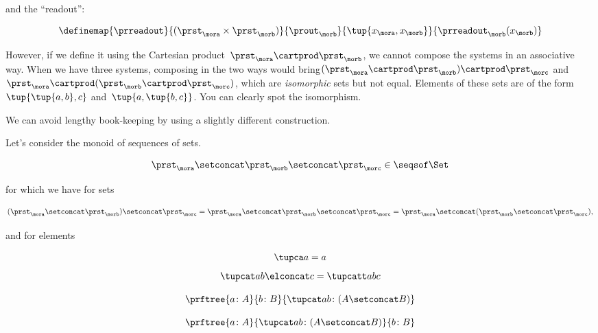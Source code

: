 and the ``readout'':

\begin{equation}
  \definemap{
    \prreadout
    }{
      (\prst_{\mora} \times \prst_{\morb}) 
    }{
      \prout_{\morb}
    }{
      \tup{x_{\mora}, x_{\morb}}
    }{
      \prreadout_{\morb}(x_{\morb})
    }
\end{equation}

However, if we define it using the Cartesian product~$\prst_{\mora} \cartprod \prst_{\morb}$, we cannot compose the systems in an associative way.
When we have three systems, composing in the two ways would bring$(\prst_{\mora} \cartprod \prst_{\morb}) \cartprod \prst_{\morc}$ and~$\prst_{\mora} \cartprod (\prst_{\morb} \cartprod \prst_{\morc})$, which are \emph{isomorphic} sets but not equal.
Elements of these sets are of the form~$\tup{\tup{a,b},c}$ and~$\tup{a, \tup{b,c}}$. You can clearly spot the isomorphism.

We can avoid lengthy book-keeping by using a slightly different construction. 

Let's consider the monoid of sequences of sets.

\begin{equation}
\prst_{\mora} \setconcat \prst_{\morb} \setconcat \prst_{\morc} \in \seqsof\Set
\end{equation}

for which we have for sets

\begin{equation}
  (\prst_{\mora} \setconcat \prst_{\morb} )\setconcat \prst_{\morc} =
  \prst_{\mora} \setconcat \prst_{\morb} \setconcat \prst_{\morc} =
  \prst_{\mora} \setconcat (\prst_{\morb} \setconcat \prst_{\morc}),
\end{equation}
  
and for elements 

\begin{equation}
  \tupca a   = a
\end{equation}
\begin{equation}
   \tupcat a b \elconcat c = \tupcatt a b c
\end{equation}

\begin{equation}
  \prftree{a \colon A}{b \colon B}{ \tupcat a b \colon (A \setconcat B) }
\end{equation}
  
\begin{equation}
  \prftree{a \colon A}{ \tupcat a b \colon (A \setconcat B) }{  b \colon  B }
\end{equation}
  

